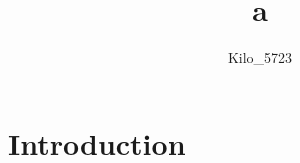 \documentclass{article}
\title{a}
\author{Kilo\_5723}
\date{}
\begin{document}
\maketitle

\section{Introduction}
\end{document}
